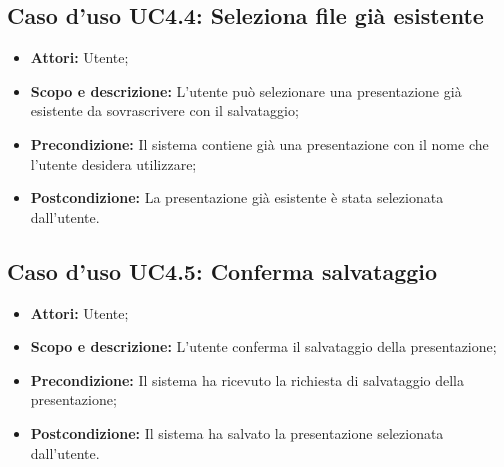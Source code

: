 \subsection{Caso d'uso UC4.4: Seleziona file già esistente}
\begin{itemize}
	\item \textbf{Attori:} Utente;
	\item \textbf{Scopo e descrizione:} L'utente può selezionare una presentazione già esistente da sovrascrivere con il salvataggio;
	\item \textbf{Precondizione:} Il sistema contiene già una presentazione con il nome che l'utente desidera utilizzare;
	\item \textbf{Postcondizione:} La presentazione già esistente è stata selezionata dall'utente.
\end{itemize}

\subsection{Caso d'uso UC4.5: Conferma salvataggio}
\begin{itemize}
	\item \textbf{Attori:} Utente;
	\item \textbf{Scopo e descrizione:} L'utente conferma il salvataggio della presentazione;
	\item \textbf{Precondizione:} Il sistema ha ricevuto la richiesta di salvataggio della presentazione;
	\item \textbf{Postcondizione:} Il sistema ha salvato la presentazione selezionata dall'utente.
\end{itemize}
\newpage